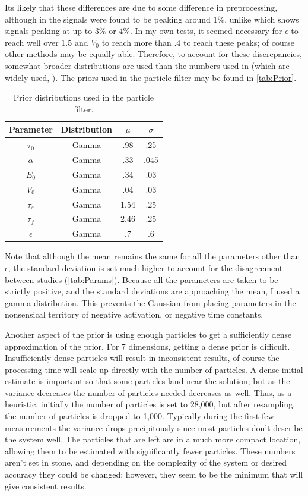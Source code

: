 Its likely that these differences are due to some difference in preprocessing,
although in \cite{Deneux2006} the signals were found to be peaking around
$1\%$, unlike \cite{Friston2000} which shows signals peaking at up to
$3\%$ or $4\%$. In my own tests, it seemed necessary for $\epsilon$ to
reach well over $1.5$ and $V_0$ to reach more than $.4$ to reach these
peaks; of course other methods may be equally able. 
Therefore, to account for these discrepancies, somewhat broader
distributions are used than the numbers used in \cite{Friston2000}
(which are widely used, \cite{Hu2009}). The 
priors used in the particle filter may be found in \autoref{tab:Prior}.

\begin{table}[t]
\centering
\begin{tabular}{|c || c | c | c |}
\hline 
Parameter & Distribution & $\mu$ & $\sigma$ \\
\hline
$\tau_0$ & Gamma & .98 & .25 \\
$\alpha$ & Gamma & .33 & .045\\
$E_0$    & Gamma & .34 & .03  \\
$V_0$    & Gamma & .04 & .03 \\
$\tau_s$ & Gamma & 1.54  & .25\\
$\tau_f$ & Gamma & 2.46  & .25\\
$\epsilon$ & Gamma & .7  & .6 \\
\hline
\end{tabular}
\caption{Prior distributions used in the particle filter.}
\label{tab:Prior} 
\end{table}

Note that although the mean remains the same for all the 
parameters other than $\epsilon$, the standard deviation is set
much higher to account for the disagreement between studies
(\autoref{tab:Params}). 
Because all the parameters are taken to be strictly positive, and the
standard deviations are approaching the mean, I used a gamma distribution.
This prevents the Gaussian from placing parameters in the nonsensical 
territory of negative activation, or negative time constants.

Another aspect of the prior is using enough particles to get a 
sufficiently dense approximation of the prior. For 7 dimensions,
getting a dense prior is difficult. Insufficiently
dense particles will result in inconsistent results, of course the
processing time will scale up directly with the number of particles.
A dense initial estimate is important so that some particles land
near the solution; but as the variance decreases the number of 
particles needed decreases as well. Thus, as a heuristic, initially
the number of particles is set to 28,000, but after resampling,
the number of particles is dropped to 1,000. Typically during the 
first few measurements the variance drops precipitously since most particles
don't describe the system well. The particles that are left are in a
much more compact location, allowing them to be estimated with 
significantly fewer particles. These numbers aren't set in stone,
and depending on the complexity of the system or desired accuracy
they could be changed; however, they seem to be the minimum that
will give consistent results.

